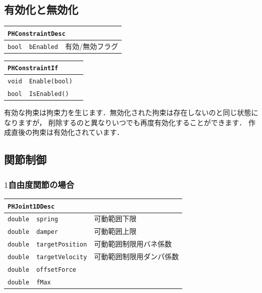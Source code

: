 \subsection*{\KLUDGE 有効化と無効化}

\begin{center}
\begin{tabular}{p{.15\hsize}p{.45\hsize}p{.30\hsize}}
\multicolumn{3}{l}{\texttt{PHConstraintDesc}}					\\ \midrule
\texttt{bool}	&	\texttt{bEnabled}	& \KLUDGE 有効/\KLUDGE 無効フラグ		\\
\end{tabular}
\end{center}

\begin{center}
\begin{tabular}{p{.15\hsize}p{.50\hsize}p{.25\hsize}}
\multicolumn{3}{l}{\texttt{PHConstraintIf}}						\\ \midrule
\texttt{void}	& \texttt{Enable(bool)}					& \\
\texttt{bool} 	& \texttt{IsEnabled()}					& \\
\end{tabular}
\end{center}

\KLUDGE 有効な拘束は拘束力を生じます．無効化された拘束は存在しないのと同じ状態になりますが，
\KLUDGE 削除するのと異なりいつでも再度有効化することができます．
\KLUDGE 作成直後の拘束は有効化されています．





\subsection*{\KLUDGE 関節制御}

\subsubsection*{$1$\KLUDGE 自由度関節の場合}

\begin{center}
\begin{tabular}{p{.15\hsize}p{.45\hsize}p{.30\hsize}}
\multicolumn{3}{l}{\texttt{PHJoint1DDesc}}								\\ \midrule
\texttt{double}	&	\texttt{spring}			& \KLUDGE 可動範囲下限				\\
\texttt{double}	&	\texttt{damper}			& \KLUDGE 可動範囲上限				\\
\texttt{double}	&	\texttt{targetPosition}	& \KLUDGE 可動範囲制限用バネ係数	\\
\texttt{double}	&	\texttt{targetVelocity}	& \KLUDGE 可動範囲制限用ダンパ係数	\\
\texttt{double}	&	\texttt{offsetForce}	& \\
\texttt{double}	&	\texttt{fMax}			& \\
\end{tabular}
\end{center}

